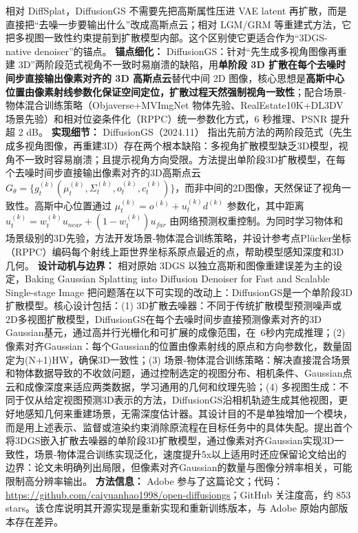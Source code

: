 相对 DiffSplat，DiffusionGS 不需要先把高斯属性压进 VAE latent 再扩散，而是直接把“去噪一步要输出什么”改成高斯点云；相对 LGM/GRM 等重建式方法，它把多视图一致性约束提前到扩散模型内部。这个区别使它更适合作为“3DGS-native denoiser”的锚点。
\textbf{锚点细化：} DiffusionGS：针对``先生成多视角图像再重建 3D''两阶段范式视角不一致时易崩溃的缺陷，用\textbf{单阶段 3D 扩散在每个去噪时间步直接输出像素对齐的 3D 高斯点云}替代中间 2D 图像，核心思想是\textbf{高斯中心位置由像素射线参数化保证空间定位，扩散过程天然强制视角一致性}；配合场景-物体混合训练策略（Objaverse+MVImgNet 物体先验、RealEstate10K+DL3DV 场景先验）和相对位姿条件化（RPPC）统一参数化方式，6 秒推理、PSNR 提升超 2 dB。
\textbf{实现细节：} DiffusionGS（2024.11） 指出先前方法的两阶段范式（先生成多视角图像，再重建3D）存在两个根本缺陷：多视角扩散模型缺乏3D模型，视角不一致时容易崩溃；且提示视角方向受限。方法提出单阶段3D扩散模型，在每个去噪时间步直接输出像素对齐的3D高斯点云 $G_\theta = \{g_t^{(k)}(\mu_t^{(k)}, \Sigma_t^{(k)}, o_t^{(k)}, c_t^{(k)})\}$，而非中间的2D图像，天然保证了视角一致性。高斯中心位置通过 $\mu_t^{(k)} = o^{(k)} + u_t^{(k)} d^{(k)}$ 参数化，其中距离 $u_t^{(k)} = w_t^{(k)} u_{near} + (1-w_t^{(k)}) u_{far}$ 由网络预测权重控制。为同时学习物体和场景级别的3D先验，方法开发场景-物体混合训练策略，并设计参考点Pl\"ucker坐标（RPPC）编码每个射线上距世界坐标系原点最近的点，帮助模型感知深度和3D几何。
\textbf{设计动机与边界：} 相对原始 3DGS 以独立高斯和图像重建误差为主的设定，Baking Gaussian Splatting into Diffusion Denoiser for Fast and Scalable Single-stage Image 把问题落在以下可实现的改动上：DiffusionGS是一个单阶段3D扩散模型。核心设计包括：(1) 3D扩散去噪器：不同于传统扩散模型预测噪声或2D多视图扩散模型，DiffusionGS在每个去噪时间步直接预测像素对齐的3D Gaussian基元，通过高并行光栅化和可扩展的成像范围，在~6秒内完成推理；(2) 像素对齐Gaussian：每个Gaussian的位置由像素射线的原点和方向参数化，数量固定为(N+1)HW，确保3D一致性；(3) 场景-物体混合训练策略：解决直接混合场景和物体数据导致的不收敛问题，通过控制选定的视图分布、相机条件、Gaussian点云和成像深度来适应两类数据，学习通用的几何和纹理先验；(4) 多视图生成：不同于仅从给定视图预测3D表示的方法，DiffusionGS沿相机轨迹生成其他视图，更好地感知几何来重建场景，无需深度估计器。其设计目的不是单独增加一个模块，而是用上述表示、监督或渲染约束消除原流程在目标任务中的具体失配。提出首个将3DGS嵌入扩散去噪器的单阶段3D扩散模型，通过像素对齐Gaussian实现3D一致性，场景-物体混合训练实现泛化，速度提升5x以上适用时还应保留论文给出的边界：论文未明确列出局限，但像素对齐Gaussian的数量与图像分辨率相关，可能限制高分辨率输出。
\textbf{方法信息：} Adobe 参与了这篇论文；代码：\url{https://github.com/caiyuanhao1998/open-diffusiongs}；GitHub 关注度高，约 853 stars。该仓库说明其开源实现是重新实现和重新训练版本，与 Adobe 原始内部版本存在差异。



